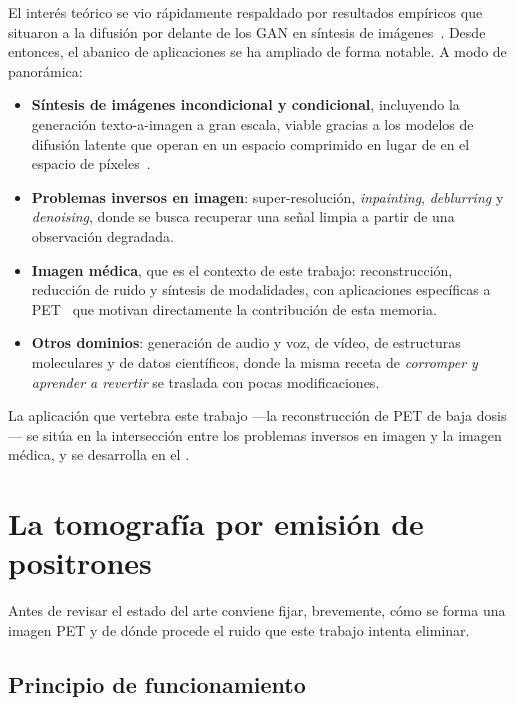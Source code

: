 El interés teórico se vio rápidamente respaldado por resultados
empíricos que situaron a la difusión por delante de los GAN en
síntesis de imágenes~\cite{dhariwal2021beatgans}. Desde entonces, el
abanico de aplicaciones se ha ampliado de forma notable. A modo de
panorámica:

\begin{itemize}
    \item \textbf{Síntesis de imágenes incondicional y condicional},
    incluyendo la generación texto-a-imagen a gran escala, viable
    gracias a los modelos de difusión latente que operan en un espacio
    comprimido en lugar de en el espacio de píxeles~\cite{rombach2022ldm}.
    \item \textbf{Problemas inversos en imagen}: super-resolución,
    \textit{inpainting}, \textit{deblurring} y \emph{denoising}, donde
    se busca recuperar una señal limpia a partir de una observación
    degradada.
    \item \textbf{Imagen médica}, que es el contexto de este trabajo:
    reconstrucción, reducción de ruido y síntesis de modalidades, con
    aplicaciones específicas a PET~\cite{scorepet2024,ddpmpet2023} que
    motivan directamente la contribución de esta memoria.
    \item \textbf{Otros dominios}: generación de audio y voz, de vídeo,
    de estructuras moleculares y de datos científicos, donde la misma
    receta de \emph{corromper y aprender a revertir} se traslada con
    pocas modificaciones.
\end{itemize}

La aplicación que vertebra este trabajo —la reconstrucción de PET de
baja dosis— se sitúa en la intersección entre los problemas inversos
en imagen y la imagen médica, y se desarrolla en el
.

\section{La tomografía por emisión de positrones}
\label{sec:pet-fisica}

Antes de revisar el estado del arte conviene fijar, brevemente, cómo
se forma una imagen PET y de dónde procede el ruido que este trabajo
intenta eliminar.

\subsection{Principio de funcionamiento}
\label{subsec:pet-funcionamiento}

